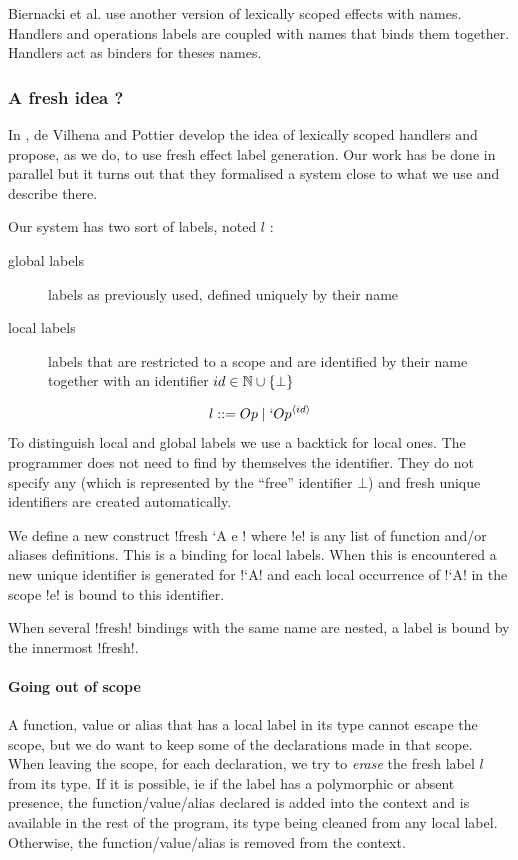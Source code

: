 \documentclass[10pt, nonacm=true, language=french, language=english]{acmart}
\begin{document}
Biernacki et al. \cite{binders-labels} use another version of lexically scoped effects with names. Handlers and operations labels are coupled with names that binds them together. Handlers act as binders for theses names.

\subsubsection{A fresh idea ?}
\label{sec:fresh-idea}

In \cite{tes}, de Vilhena and Pottier develop the idea of lexically scoped handlers and propose, as we do, to use fresh effect label generation. Our work has be done in parallel but it turns out that they formalised a system close to what we use and describe there.

Our system has two sort of labels, noted $l$ :
\begin{description}
  \item[global labels] labels as previously used, defined uniquely by their name
  \item[local labels] labels that are restricted to a scope and are identified by their name together with an identifier $id \in \mathbb N \cup \{\bot\}$
\end{description}
$$ l ::= Op \mid `Op^{\langle id\rangle} $$
To distinguish local and global labels we use a backtick for local ones. The programmer does not need to find by themselves the identifier. They do not specify any (which is represented by the ``free'' identifier $\bot$) and fresh unique identifiers are created automatically.

We define a new construct !fresh `A { e }!  where !e! is any list of function and/or aliases definitions. This is a binding for local labels. When this is encountered a new unique identifier is generated for !`A! and each local occurrence of !`A! in the scope !e! is bound to this identifier.
\begin{rem}
  When several !fresh! bindings with the same name are nested, a label is bound by the innermost !fresh!.
\end{rem}

\paragraph{Going out of scope}
A function, value or alias that has a local label in its type cannot escape the scope, but we do want to keep some of the declarations made in that scope. When leaving the scope, for each declaration, we try to \emph{erase} the fresh label $l$ from its type. If it is possible, ie if the label has a polymorphic or absent presence, the function/value/alias declared is added into the context and is available in the rest of the program, its type being cleaned from any local label. Otherwise, the function/value/alias is removed from the context.
\end{document}
